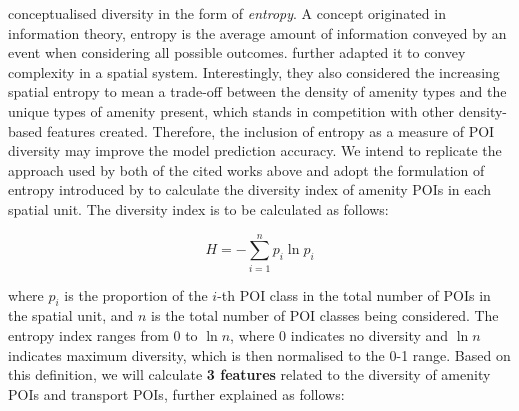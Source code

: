 \citet{cerveroTravelDemand3Ds1997} conceptualised diversity in the form of \textit{entropy}. A concept originated in information theory, entropy is the average amount of information conveyed by an event when considering all possible outcomes. \citet{battyEntropyComplexitySpatial2014} further adapted it to convey complexity in a spatial system. Interestingly, they also considered the increasing spatial entropy to mean a trade-off between the density of amenity types and the unique types of amenity present, which stands in competition with other density-based features created. Therefore, the inclusion of entropy as a measure of POI diversity may improve the model prediction accuracy. We intend to replicate the approach used by both of the cited works above and adopt the formulation of entropy introduced by \citet{shannonMathematicalTheoryCommunication1948} to calculate the diversity index of amenity POIs in each spatial unit. The diversity index is to be calculated as follows:

\begin{equation}
    H = -\sum_{i=1}^{n} p_i \ln p_i
\end{equation}

where $p_i$ is the proportion of the $i$-th POI class in the total number of POIs in the spatial unit, and $n$ is the total number of POI classes being considered. The entropy index ranges from 0 to $\ln n$, where 0 indicates no diversity and $\ln n$ indicates maximum diversity, which is then normalised to the 0-1 range. Based on this definition, we will calculate \textbf{3 features} related to the diversity of amenity POIs and transport POIs, further explained as follows:

